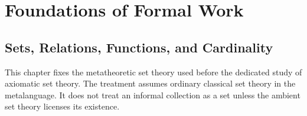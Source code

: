 \part{Foundations of Formal Work}

\chapter{Sets, Relations, Functions, and Cardinality}
\label{ch:set-prerequisites}

This chapter fixes the metatheoretic set theory used before the dedicated
study of axiomatic set theory.  The treatment assumes ordinary classical set
theory in the metalanguage.  It does not treat an informal collection as a set
unless the ambient set theory licenses its existence.

